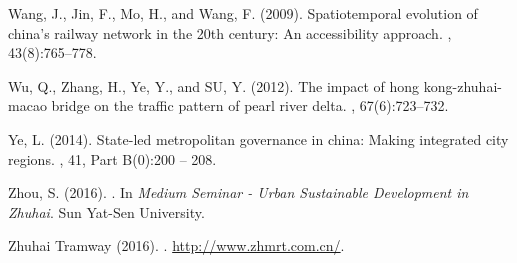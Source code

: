 \begin{thebibliography}{}
Wang, J., Jin, F., Mo, H., and Wang, F. (2009).
\newblock Spatiotemporal evolution of china’s railway network in the 20th
  century: An accessibility approach.
,
  43(8):765--778.

Wu, Q., Zhang, H., Ye, Y., and SU, Y. (2012).
\newblock The impact of hong kong-zhuhai-macao bridge on the traffic pattern of
  pearl river delta.
, 67(6):723--732.

Ye, L. (2014).
\newblock State-led metropolitan governance in china: Making integrated city
  regions.
, 41, Part B(0):200 -- 208.

Zhou, S. (2016).
.
\newblock In {\em {Medium Seminar - Urban Sustainable Development in Zhuhai}}.
  {Sun Yat-Sen University}.

{Zhuhai Tramway} (2016).
.
\newblock \url{http://www.zhmrt.com.cn/}.

\end{thebibliography}








